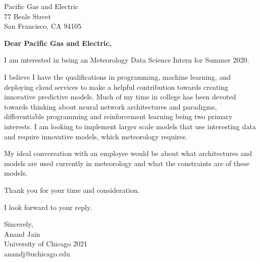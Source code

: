 \documentclass[11pt,a4paper]{letter} %
\begin{document}
\begin{letter}{Pacific Gas and Electric \\ 77 Beale Street \\ San Francisco, CA 94105} 

\opening{\textbf{Dear Pacific Gas and Electric,}}

I am interested in being an Meteorology Data Science Intern for Summer 2020.

I believe I have the qualifications in programming, machine learning, and deploying cloud services to make a helpful contribution towards creating innovative predictive models.
Much of my time in college has been devoted towards thinking about neural network architectures and paradigms, differentiable programming and reinforcement learning being two primary interests. 
I am looking to implement larger scale models that use interesting data and require innovative models, which meteorology requires.

My ideal conversation with an employee would be about what architectures and models are used currently in meteorology and what the constraints are of these models.

Thank you for your time and consideration.

I look forward to your reply.

\closing{Sincerely, \\ Anand Jain \\ University of Chicago 2021 \\ anandj@uchicago.edu}

\end{letter}
 
\end{document}
